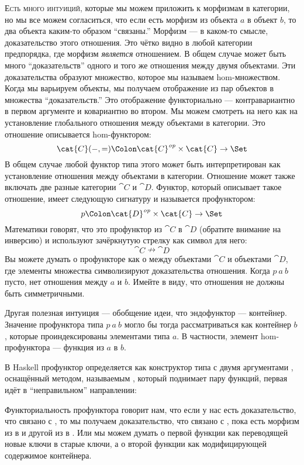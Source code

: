 
\lettrine[lhang=0.17]{Е}{сть много интуиций}, которые мы можем приложить к морфизмам в категории,
но мы все можем согласиться, что если есть морфизм из объекта
$a$ в объект $b$, то два объекта каким-то образом
``связаны.'' Морфизм --- в каком-то смысле, доказательство этого отношения. Это
чётко видно в любой категории предпорядка, где морфизм \emph{является}
отношением. В общем случае может быть много ``доказательств'' одного и того же отношения
между двумя объектами. Эти доказательства образуют множество, которое мы называем hom-множеством.
Когда мы варьируем объекты, мы получаем отображение из пар объектов в множества
``доказательств.'' Это отображение функториально --- контравариантно в первом
аргументе и ковариантно во втором. Мы можем смотреть на него как на установление
глобального отношения между объектами в категории. Это отношение
описывается hom-функтором:
\[\cat{C}(-, =) \Colon \cat{C}^\mathit{op}\times{}\cat{C} \to \Set\]
В общем случае любой функтор типа этого может быть интерпретирован как установление
отношения между объектами в категории. Отношение может также включать две
разные категории $\cat{C}$ и $\cat{D}$. Функтор, который описывает
такое отношение, имеет следующую сигнатуру и называется профунктором:
\[p \Colon \cat{D}^\mathit{op}\times{}\cat{C} \to \Set\]
Математики говорят, что это профунктор из $\cat{C}$ в $\cat{D}$
(обратите внимание на инверсию) и используют зачёркнутую стрелку как символ для него:
\[\cat{C} \nrightarrow \cat{D}\]
Вы можете думать о профункторе как о 
между объектами $\cat{C}$ и объектами $\cat{D}$, где элементы
множества символизируют доказательства отношения. Когда $p\ a\ b$
пусто, нет отношения между $a$ и $b$. Имейте
в виду, что отношения не должны быть симметричными.

Другая полезная интуиция --- обобщение идеи, что
эндофунктор --- контейнер. Значение профунктора типа
$p\ a\ b$ могло бы тогда рассматриваться как контейнер $b$,
которые проиндексированы элементами типа $a$. В частности, элемент
hom-профунктора --- функция из $a$ в $b$.

В Haskell профунктор определяется как конструктор типа с двумя аргументами
, оснащённый методом, называемым , который поднимает
пару функций, первая идёт в ``неправильном'' направлении:

Функториальность профунктора говорит нам, что если у нас есть доказательство,
что  связано с , то мы получаем доказательство, что
 связано с , пока есть морфизм из
 в  и другой из  в . Или
мы можем думать о первой функции как переводящей новые ключи в старые
ключи, а о второй функции как модифицирующей содержимое
контейнера.

